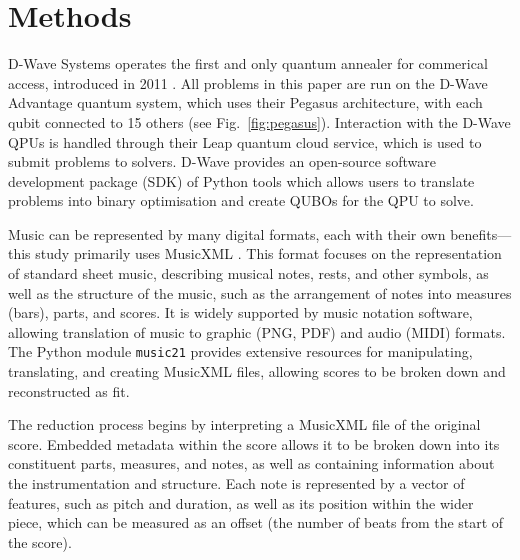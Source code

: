 \documentclass[aps,pra,10pt,twocolumn]{revtex4-2}
\begin{document}

\section{Methods}

D-Wave Systems operates the first and only quantum annealer for commerical access, introduced in 2011 \cite{dwave_manufactured_2011}. All problems in this paper are run on the D-Wave Advantage quantum system, which uses their Pegasus architecture, with each qubit connected to 15 others (see Fig.\ \ref{fig:pegasus}).
Interaction with the D-Wave QPUs is handled through their Leap quantum cloud service, which is used to submit problems to solvers. D-Wave provides an open-source software development package (SDK) of Python tools which allows users to translate problems into binary optimisation and create QUBOs for the QPU to solve.

Music can be represented by many digital formats, each with their own benefits—this study primarily uses MusicXML \cite{musicxml}. This format focuses on the representation of standard sheet music, describing musical notes, rests, and other symbols, as well as the structure of the music, such as the arrangement of notes into measures (bars), parts, and scores. It is widely supported by music notation software, allowing translation of music to graphic (PNG, PDF) and audio (MIDI) formats. The Python module \verb|music21| provides extensive resources for manipulating, translating, and creating MusicXML files, allowing scores to be broken down and reconstructed as fit.

The reduction process begins by interpreting a MusicXML file of the original score. Embedded metadata within the score allows it to be broken down into its constituent parts, measures, and notes, as well as containing information about the instrumentation and structure. Each note is represented by a vector of features, such as pitch and duration, as well as its position within the wider piece, which can be measured as an offset (the number of beats from the start of the score).
\end{document}
